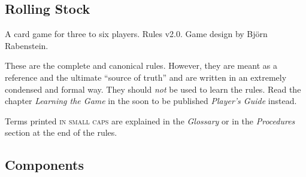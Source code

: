 \documentclass[11pt,a4paper]{article}
\begin{document}
\begin{center}
\section*{Rolling Stock}

A card game for three to six players. Rules v2.0. Game design by
Björn Rabenstein.
\end{center}

These are the complete and canonical rules. However, they are meant as
a reference and the ultimate ``source of truth'' and are written in an
extremely condensed and formal way. They should \emph{not} be used to
learn the rules. Read the chapter \emph{Learning the Game} in the soon
to be published \emph{Player's Guide} instead.

\begin{multicols}{2}

{
\small

  Terms printed \textsc{in small caps} are explained in the
  \emph{Glossary} or in the \emph{Procedures} section at the end of
  the rules.

\subsection*{Components}

}
\end{multicols}
\end{document}
